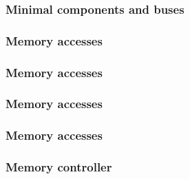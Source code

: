 
\begin{frame}
  \frametitle{Minimal components and buses}

  \begin{center}
  \end{center}

\end{frame}


\begin{frame}
  \frametitle{Memory accesses}

  \begin{center}
  \end{center}

\end{frame}


\begin{frame}
  \frametitle{Memory accesses}

  \begin{center}
  \end{center}

\end{frame}


\begin{frame}
  \frametitle{Memory accesses}

  \begin{center}
  \end{center}

\end{frame}


\begin{frame}
  \frametitle{Memory accesses}

  \begin{center}
  \end{center}

\end{frame}


\begin{frame}
  \frametitle{Memory controller}

  \begin{center}
  \end{center}

\end{frame}

